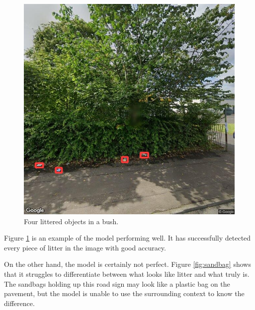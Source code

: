 \documentclass{thesis}
\begin{document}
\begin{figure}[h!]
    \centering
    \includegraphics[scale=0.45]{images/good-4-in-bush.jpg}
    \caption{Four littered objects in a bush.}
    \label{fig:4-in-bush}
\end{figure}

Figure \ref{fig:4-in-bush} is an example of the model performing well. It has successfully detected every piece of litter in the image with good accuracy. 

On the other hand, the model is certainly not perfect. Figure \ref{fig:sandbag} shows that it struggles to differentiate between what looks like litter and what truly is. The sandbags holding up this road sign may look like a plastic bag on the pavement, but the model is unable to use the surrounding context to know the difference.
\end{document}
